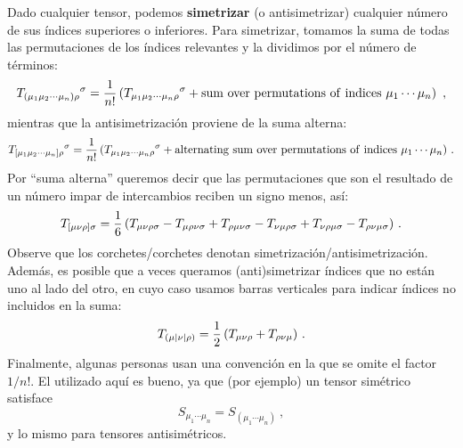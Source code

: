 \documentclass[11pt,b5paper,openany,twoside]{book}
\begin{document}
Dado cualquier tensor, podemos {\bf simetrizar} (o antisimetrizar) cualquier número de sus índices superiores o inferiores.
Para simetrizar, tomamos la suma de todas las permutaciones de los índices relevantes y la dividimos por el número de términos:
\begin{equation}
T_{(\mu_1\mu_2\cdots\mu_n)\rho}{}^\sigma = {1\over {n!}}
\left(T_{\mu_1\mu_2\cdots\mu_n\rho}{}^\sigma +
{\rm sum~over~permutations~of~indices~}\mu_1\cdots\mu_n \right)
\ ,\label{1.67}
\end{equation}
mientras que la antisimetrización proviene de la suma alterna:
\begin{equation}
T_{[\mu_1\mu_2\cdots\mu_n]\rho}{}^\sigma = {1\over {n!}}
\left(T_{\mu_1\mu_2\cdots\mu_n\rho}{}^\sigma +
{\rm alternating~sum~over~permutations~of~indices~ }
\mu_1\cdots\mu_n \right)\,.\label{1.68}
\end{equation}
Por ``suma alterna'' queremos decir que las permutaciones que son el resultado de un número impar de intercambios reciben un signo menos, así:
\begin{equation}
T_{[\mu\nu\rho]\sigma} = {1\over 6}\left(T_{\mu\nu\rho\sigma}
- T _{\mu\rho\nu\sigma} + T_{\rho\mu\nu\sigma} - T_{\nu\mu\rho\sigma}
+ T_{\nu\rho\mu\sigma} - T_{\rho\nu\mu\sigma}
\right)\,.\label{1.69}
\end{equation}
Observe que los corchetes/corchetes denotan simetrización/antisimetrización.
Además, es posible que a veces queramos (anti)simetrizar índices que no están uno al lado del otro, en cuyo caso usamos barras verticales para indicar índices no incluidos en la suma:
\begin{equation}
T_{(\mu |\nu |\rho)} = {1\over 2}\left(T_{\mu\nu\rho}
+ T_{\rho\nu\mu}\right)\,.\label{1.70}
\end{equation}
Finalmente, algunas personas usan una convención en la que se omite el factor $1/n!$.
El utilizado aquí es bueno, ya que (por ejemplo) un tensor simétrico satisface
\begin{equation}
S_{\mu_1 \cdots \mu_n} = S_{(\mu_1 \cdots \mu_n)} \ ,\label{1.71}
\end{equation}
y lo mismo para tensores antisimétricos.
\end{document}
